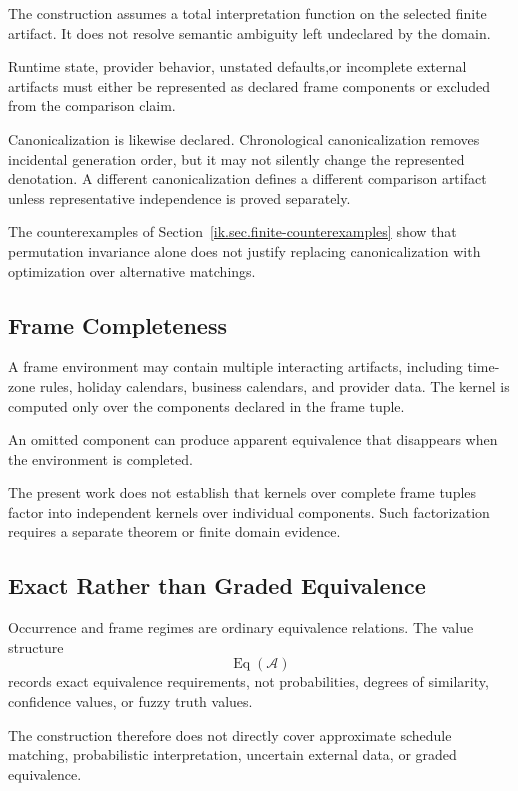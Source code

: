 \documentclass[11pt]{article}
\theoremstyle{plain}
\theoremstyle{definition}
\theoremstyle{remark}
\begin{document}
The construction assumes a total interpretation function
on the selected finite artifact.
It does not resolve semantic ambiguity
left undeclared by the domain.

Runtime state, provider behavior,
unstated defaults,or incomplete external artifacts
must either be represented as declared frame components
or excluded from the comparison claim.

Canonicalization is likewise declared.
Chronological canonicalization removes incidental generation order,
but it may not silently change the represented denotation.
A different canonicalization defines a different comparison artifact
unless representative independence is proved separately.

The counterexamples of
Section~\ref{ik.sec.finite-counterexamples}
show that permutation invariance alone
does not justify replacing canonicalization
with optimization over alternative matchings.

\subsection{Frame Completeness}

A frame environment may contain multiple interacting artifacts,
including time-zone rules, holiday calendars,
business calendars, and provider data.
The kernel is computed only over the components declared
in the frame tuple.

An omitted component can produce apparent equivalence
that disappears when the environment is completed.

The present work does not establish
that kernels over complete frame tuples
factor into independent kernels over individual components.
Such factorization requires a separate theorem
or finite domain evidence.

\subsection{Exact Rather than Graded Equivalence}

Occurrence and frame regimes
are ordinary equivalence relations.
The value structure
\[
  \operatorname{Eq}(\mathcal{A})
\]
records exact equivalence requirements,
not probabilities,
degrees of similarity,
confidence values,
or fuzzy truth values.

The construction therefore does not directly cover
approximate schedule matching,
probabilistic interpretation,
uncertain external data,
or graded equivalence.
\end{document}
